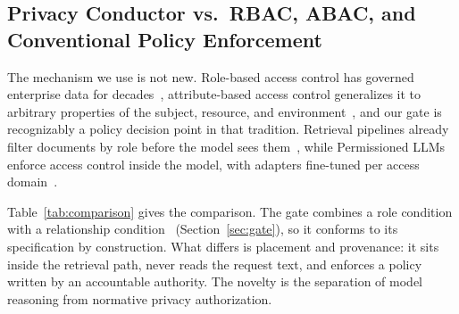 \subsection{Privacy Conductor vs.\ RBAC, ABAC, and Conventional Policy Enforcement}
The mechanism we use is not new. Role-based access control has governed
enterprise data for decades~\cite{sandhu1996}, attribute-based access control
generalizes it to arbitrary properties of the subject, resource, and
environment~\cite{hu2014abac}, and our gate is recognizably a policy decision
point in that tradition. Retrieval pipelines already filter documents by role
before the model sees them~\cite{chen2025sac}, while Permissioned LLMs enforce
access control inside the model, with adapters fine-tuned per access
domain~\cite{jayaraman2025permissioned}.

\begin{table}[!t]
\centering
\caption{Privacy Conductor (PC) compared with conventional policy enforcement
and LLM-mediated Contextual Integrity (LLM-CI).}
\label{tab:comparison}
\footnotesize
\setlength{\tabcolsep}{3pt}
\end{table}

Table~\ref{tab:comparison} gives the comparison. The gate combines a role
condition with a relationship condition~\cite{fong2011}
(Section~\ref{sec:gate}), so it conforms to its specification by construction.
What differs is placement and provenance: it sits inside the retrieval path,
never reads the request text, and enforces a policy written by an accountable
authority. The novelty is the separation of model reasoning from normative
privacy authorization.
